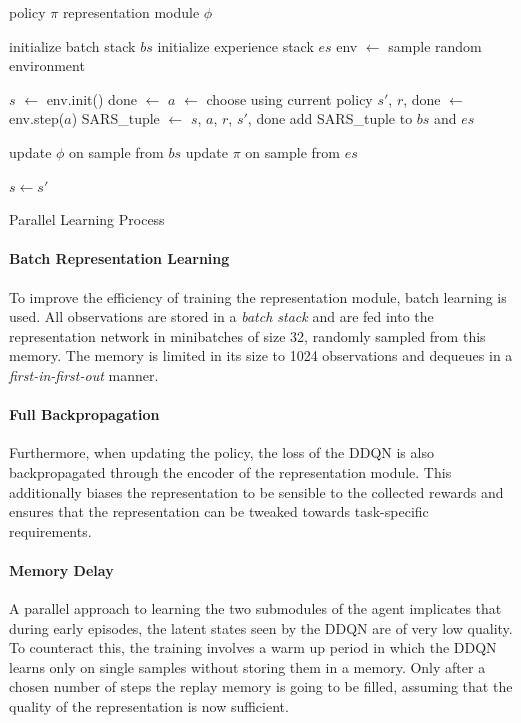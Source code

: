 \begin{algorithm}[t]
    \begin{algorithmic}
        \REQUIRE policy $\pi$
        \REQUIRE representation module $\phi$
    
        \STATE initialize batch stack $bs$
        \STATE initialize experience stack $es$
            \STATE env $\leftarrow$ sample random environment
            
            \STATE $s$ $\leftarrow$ env.init()
            \STATE done $\leftarrow$ \FALSE
                \STATE $a$ $\leftarrow$ choose using current policy
                \STATE $s'$, $r$, done $\leftarrow$ env.step($a$)
                \STATE SARS\_tuple $\leftarrow$ $s$, $a$, $r$, $s'$, done
                \STATE add SARS\_tuple to $bs$ and $es$
                
                \STATE update $\phi$ on sample from $bs$
                \STATE update $\pi$ on sample from $es$
                
                \STATE $s \leftarrow s'$
            \ENDWHILE
        \ENDFOR
    \end{algorithmic}
    
    \caption{Parallel Learning Process\label{alg:parallel}}
\end{algorithm}

\paragraph{Batch Representation Learning} To improve the efficiency of training the representation module, batch learning is used. All observations are stored in a \textit{batch stack} and are fed into the representation network in minibatches of size 32, randomly sampled from this memory. The memory is limited in its size to 1024 observations and dequeues in a \textit{first-in-first-out} manner.

\paragraph{Full Backpropagation} Furthermore, when updating the policy, the loss of the DDQN is also backpropagated through the encoder of the representation module. This additionally biases the representation to be sensible to the collected rewards and ensures that the representation can be tweaked towards task-specific requirements.

\paragraph{Memory Delay} A parallel approach to learning the two submodules of the agent implicates that during early episodes, the latent states seen by the DDQN are of very low quality. To counteract this, the training involves a warm up period in which the DDQN learns only on single samples without storing them in a memory. Only after a chosen number of steps the replay memory is going to be filled, assuming that the quality of the representation is now sufficient.

